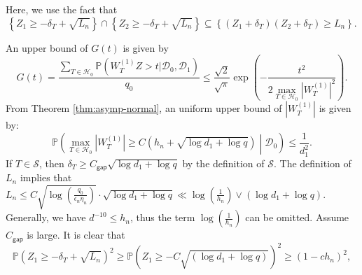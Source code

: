 \documentclass[12pt]{article}
\newcommand{\abs}[1]{\left\lvert#1\right\rvert}
\newcommand{\PP}{\mathbb{P}}
\newcommand{\cH}{\mathcal{H}}
\newcommand{\cD}{\mathcal{D}}
\newcommand{\cS}{\mathcal{S}}
\def\PP{{\mathbb P}}
\theoremstyle{plain}
\begin{document}
Here, we use the fact that
\begin{equation*}
    \left\{ Z_1\ge -\delta_T+\sqrt{L_n} \right\} \cap \left\{ Z_2\ge -\delta_T+\sqrt{L_n} \right\} \subseteq \left\{(Z_1+\delta_T)(Z_2+\delta_T) \ge L_n \right\}.
\end{equation*}
 
An upper bound of $G(t)$ is given by 
\begin{equation*}
    G(t)= \frac{\sum_{T\in\cH_0 } \PP( {W}^{(1)}_{T} Z > t |\cD_0,\cD_1 )   }{q_0}\le \frac{\sqrt{2}}{\sqrt{\pi}} \exp{\left( -\frac{t^2}{ 2\max_{T\in\cH_0} \abs{{W}^{(1)}_{T} }^2 } \right)}.
\end{equation*}
From Theorem \ref{thm:asymp-normal}, an uniform upper bound of $\abs{{W}^{(1)}_{T} }$ is given by:
\begin{equation*}
    \PP\left(\max_{T\in\cH_0}\abs{{W}^{(1)}_{T} } \ge C(h_n +\sqrt{\log d_1 +\log q}) \middle|\cD_0  \right)\le \frac{1}{d_1^2}.
\end{equation*}
If $T\in \cS$, then $\delta_T\ge C_{\mathsf{gap}} \sqrt{\log d_1 +\log q} $ by the definition of $\cS$. The definition of $L_n$ implies that $L_n  \le C \sqrt{\log(\frac{q_0}{\epsilon_n \eta_n})}\cdot  \sqrt{\log d_1 +\log q} \ll \log(\frac{1}{h_n})\vee (\log d_1 +\log q) $. Generally, we have $d^{-10}\le h_n$, thus the term $\log (\frac{1}{h_n})$ can be omitted. Assume $C_{\mathsf{gap}}$ is large. It is clear that 
\begin{equation*}
    \PP\left( Z_1\ge -\delta_T+\sqrt{L_n} \right)^2\ge  \PP\left( Z_1\ge -C\sqrt{ (\log d_1 +\log q) }  \right)^2\ge (1- c h_n)^2,
\end{equation*}
\end{document}
